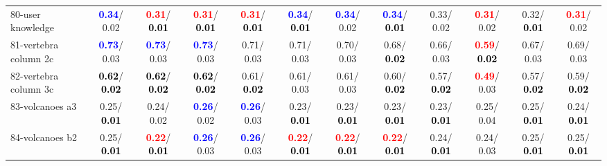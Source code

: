 \begin{table}[h]
\begin{center}
{\begin{tabular}{lc|c|c|c|c|c|c|c|c|c|c}
80-user knowledge & \textcolor{blue}{\textbf{  0.34}}/  0.02 & \textcolor{red}{\textbf{  0.31}}/\textcolor{black}{\textbf{  0.01}} & \textcolor{red}{\textbf{  0.31}}/\textcolor{black}{\textbf{  0.01}} & \textcolor{red}{\textbf{  0.31}}/\textcolor{black}{\textbf{  0.01}} & \textcolor{blue}{\textbf{  0.34}}/\textcolor{black}{\textbf{  0.01}} & \textcolor{blue}{\textbf{  0.34}}/  0.02 & \textcolor{blue}{\textbf{  0.34}}/\textcolor{black}{\textbf{  0.01}} &   0.33/  0.02 & \textcolor{red}{\textbf{  0.31}}/  0.02 &   0.32/\textcolor{black}{\textbf{  0.01}} & \textcolor{red}{\textbf{  0.31}}/  0.02 \\
81-vertebra column 2c & \textcolor{blue}{\textbf{  0.73}}/  0.03 & \textcolor{blue}{\textbf{  0.73}}/  0.03 & \textcolor{blue}{\textbf{  0.73}}/  0.03 &   0.71/  0.03 &   0.71/  0.03 &   0.70/  0.03 &   0.68/\textcolor{black}{\textbf{  0.02}} &   0.66/  0.03 & \textcolor{red}{\textbf{  0.59}}/\textcolor{black}{\textbf{  0.02}} &   0.67/  0.03 &   0.69/  0.03 \\
82-vertebra column 3c & \textcolor{black}{\textbf{  0.62}}/\textcolor{black}{\textbf{  0.02}} & \textcolor{black}{\textbf{  0.62}}/\textcolor{black}{\textbf{  0.02}} & \textcolor{black}{\textbf{  0.62}}/\textcolor{black}{\textbf{  0.02}} &   0.61/\textcolor{black}{\textbf{  0.02}} &   0.61/  0.03 &   0.61/  0.03 &   0.60/\textcolor{black}{\textbf{  0.02}} &   0.57/\textcolor{black}{\textbf{  0.02}} & \textcolor{red}{\textbf{  0.49}}/  0.03 &   0.57/\textcolor{black}{\textbf{  0.02}} &   0.59/\textcolor{black}{\textbf{  0.02}} \\
83-volcanoes a3 &   0.25/\textcolor{black}{\textbf{  0.01}} &   0.24/  0.02 & \textcolor{blue}{\textbf{  0.26}}/  0.02 & \textcolor{blue}{\textbf{  0.26}}/  0.03 &   0.23/\textcolor{black}{\textbf{  0.01}} &   0.23/\textcolor{black}{\textbf{  0.01}} &   0.23/\textcolor{black}{\textbf{  0.01}} &   0.23/\textcolor{black}{\textbf{  0.01}} &   0.25/  0.04 &   0.25/\textcolor{black}{\textbf{  0.01}} &   0.24/\textcolor{black}{\textbf{  0.01}} \\
84-volcanoes b2 &   0.25/\textcolor{black}{\textbf{  0.01}} & \textcolor{red}{\textbf{  0.22}}/\textcolor{black}{\textbf{  0.01}} & \textcolor{blue}{\textbf{  0.26}}/  0.03 & \textcolor{blue}{\textbf{  0.26}}/  0.03 & \textcolor{red}{\textbf{  0.22}}/\textcolor{black}{\textbf{  0.01}} & \textcolor{red}{\textbf{  0.22}}/\textcolor{black}{\textbf{  0.01}} & \textcolor{red}{\textbf{  0.22}}/\textcolor{black}{\textbf{  0.01}} &   0.24/\textcolor{black}{\textbf{  0.01}} &   0.24/  0.03 &   0.25/\textcolor{black}{\textbf{  0.01}} &   0.25/\textcolor{black}{\textbf{  0.01}} \\

\end{tabular}}
\end{center}
\end{table}
